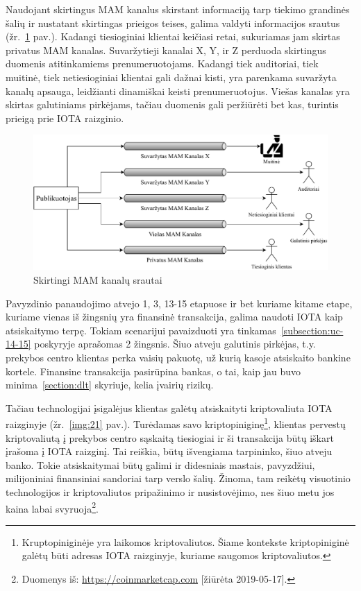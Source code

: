 Naudojant skirtingus MAM kanalus skirstant informaciją tarp tiekimo grandinės šalių ir nustatant skirtingas prieigos teises, galima valdyti informacijos srautus (žr.~\ref{img:20} pav.). Kadangi tiesioginiai klientai keičiasi retai, sukuriamas jam skirtas privatus MAM kanalas. Suvaržytieji kanalai X, Y, ir Z perduoda skirtingus duomenis atitinkamiems prenumeruotojams. Kadangi tiek auditoriai, tiek muitinė, tiek netiesioginiai klientai gali dažnai kisti, yra parenkama suvaržyta kanalų apsauga, leidžianti dinamiškai keisti prenumeruotojus. Viešas kanalas yra skirtas galutiniams pirkėjams, tačiau duomenis gali peržiūrėti bet kas, turintis prieigą prie IOTA raizginio.

\begin{figure}[H]
    \centering
    \includegraphics[scale=0.8]{images/mam-channel-flows}
    \caption{Skirtingi MAM kanalų srautai}
    \label{img:20}
\end{figure}

Pavyzdinio panaudojimo atvejo 1, 3, 13-15 etapuose ir bet kuriame kitame etape, kuriame vienas iš žingsnių yra finansinė transakcija, galima naudoti IOTA kaip atsiskaitymo terpę. Tokiam scenarijui pavaizduoti yra tinkamas~\ref{subsection:uc-14-15} poskyryje aprašomas 2 žingsnis. Šiuo atveju galutinis pirkėjas, t.y. prekybos centro klientas perka vaisių pakuotę, už kurią kasoje atsiskaito bankine kortele. Finansine transakcija pasirūpina bankas, o tai, kaip jau buvo minima~\ref{section:dlt} skyriuje, kelia įvairių rizikų.

Tačiau technologijai įsigalėjus klientas galėtų atsiskaityti kriptovaliuta IOTA raizginyje (žr.~\ref{img:21} pav.). Turėdamas savo kriptopiniginę\footnote{Kruptopiniginėje yra laikomos kriptovaliutos. Šiame kontekste kriptopiniginė galėtų būti adresas IOTA raizginyje, kuriame saugomos kriptovaliutos.}, klientas pervestų kriptovaliutą į prekybos centro sąskaitą tiesiogiai ir ši transakcija būtų iškart įrašoma į IOTA raizginį. Tai reiškia, būtų išvengiama tarpininko, šiuo atveju banko. Tokie atsiskaitymai būtų galimi ir didesniais mastais, pavyzdžiui, milijoniniai finansiniai sandoriai tarp verslo šalių. Žinoma, tam reikėtų visuotinio technologijos ir kriptovaliutos pripažinimo ir nusistovėjimo, nes šiuo metu jos kaina labai svyruoja\footnote{Duomenys iš: \href{https://coinmarketcap.com}{https://coinmarketcap.com} [žiūrėta 2019-05-17].}.

